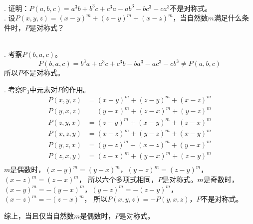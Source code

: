\documentclass[12pt,UTF8,fontset=none]{ctexbook}
\begin{document}
\begin{et}
    \mbox{} \\
    . 证明：$P(a, b, c) = a^3b + b^3c + c^3a - ab^3 - bc^3 - ca^3$不是对称式。\\
    . 设$P(x, y, z) = (x - y)^m + (z - y)^m + (x - z)^m$，当自然数$m$满足什么条件时，$P$是对称式？\\
\end{et}

\begin{so}
    \mbox{} \\
    . 考察$P(b, a, c)$。
    $$  P(b, a, c) = b^3a + a^3c + c^3b - ba^3 - ac^3 - cb^3 \neq P(a, b, c) $$
    所以$P$不是对称式。

    . 考察$\mathbb{P}_3$中元素对$P$的作用。
    \begin{align*}
        P(x, y, z) &= (x - y)^m + (z - y)^m + (x - z)^m \\
        P(y, x, z) &= (y - x)^m + (z - x)^m + (y - z)^m \\
        P(z, y, x) &= (z - y)^m + (x - y)^m + (z - x)^m \\
        P(x, z, y) &= (x - z)^m + (y - z)^m + (x - y)^m \\
        P(y, z, x) &= (y - z)^m + (x - z)^m + (y - x)^m \\
        P(z, x, y) &= (z - x)^m + (y - x)^m + (z - y)^m \\
    \end{align*}
    $m$是偶数时，$(x - y)^m = (y - x)^m$，$(y - z)^m = (z - y)^m$，$(x - z)^m = (z - x)^m$，
    所以六个多项式相同，$P$是对称式。$m$是奇数时，$(x - y)^m = -(y - x)^m$，$(y - z)^m = -(z - y)^m$，$(x - z)^m = -(z - x)^m$，
    所以$P(x, y, z) = -P(y, x, z) $，$P$不是对称式。

    综上，当且仅当自然数$m$是偶数时，$P$是对称式。
\end{so}


\end{document}
